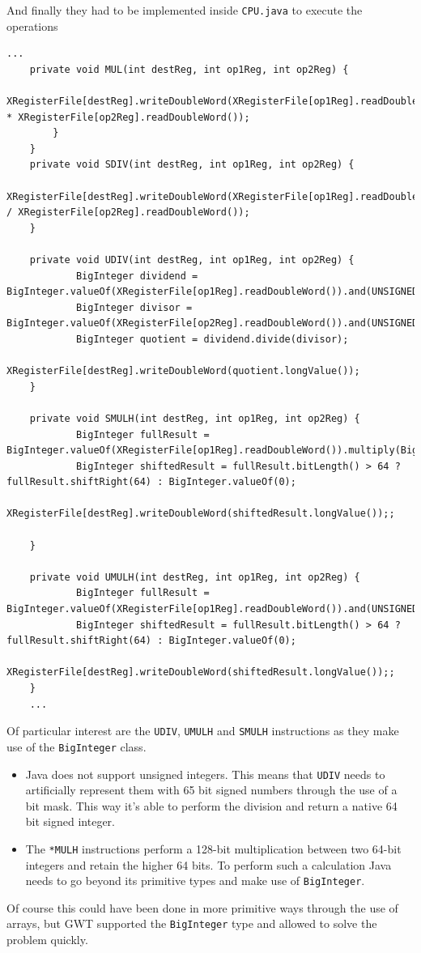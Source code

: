 And finally they had to be implemented inside \verb|CPU.java| to execute the operations
\begin{lstlisting}[caption={}]
	...
	private void MUL(int destReg, int op1Reg, int op2Reg) {											
			XRegisterFile[destReg].writeDoubleWord(XRegisterFile[op1Reg].readDoubleWord() * XRegisterFile[op2Reg].readDoubleWord());
		}
	}
	private void SDIV(int destReg, int op1Reg, int op2Reg) {
			XRegisterFile[destReg].writeDoubleWord(XRegisterFile[op1Reg].readDoubleWord() / XRegisterFile[op2Reg].readDoubleWord());
	}
	
	private void UDIV(int destReg, int op1Reg, int op2Reg) {
			BigInteger dividend = BigInteger.valueOf(XRegisterFile[op1Reg].readDoubleWord()).and(UNSIGNED_LONG_MASK);
			BigInteger divisor = BigInteger.valueOf(XRegisterFile[op2Reg].readDoubleWord()).and(UNSIGNED_LONG_MASK);
			BigInteger quotient = dividend.divide(divisor);
			XRegisterFile[destReg].writeDoubleWord(quotient.longValue());
	}
	
	private void SMULH(int destReg, int op1Reg, int op2Reg) {
			BigInteger fullResult = BigInteger.valueOf(XRegisterFile[op1Reg].readDoubleWord()).multiply(BigInteger.valueOf(XRegisterFile[op2Reg].readDoubleWord()));
			BigInteger shiftedResult = fullResult.bitLength() > 64 ? fullResult.shiftRight(64) : BigInteger.valueOf(0);
			XRegisterFile[destReg].writeDoubleWord(shiftedResult.longValue());;
			
	}
	
	private void UMULH(int destReg, int op1Reg, int op2Reg) {
			BigInteger fullResult = BigInteger.valueOf(XRegisterFile[op1Reg].readDoubleWord()).and(UNSIGNED_LONG_MASK).multiply(BigInteger.valueOf(XRegisterFile[op2Reg].readDoubleWord()).and(UNSIGNED_LONG_MASK));
			BigInteger shiftedResult = fullResult.bitLength() > 64 ? fullResult.shiftRight(64) : BigInteger.valueOf(0);
			XRegisterFile[destReg].writeDoubleWord(shiftedResult.longValue());;
	}
	...
\end{lstlisting}
Of particular interest are the \verb|UDIV|, \verb|UMULH| and \verb|SMULH| instructions as they make use of the \verb|BigInteger| class.
\begin{itemize}[label=\textendash]
\item Java does not support unsigned integers. This means that \verb|UDIV| needs to artificially represent them with 65 bit signed numbers through the use of a bit mask. This way it's able to perform the division and return a native 64 bit signed integer.
\item The \verb|*MULH| instructions perform a 128-bit multiplication between two 64-bit integers and retain the higher 64 bits. To perform such a calculation Java needs to go beyond its primitive types and make use of \verb|BigInteger|.
\end{itemize}
Of course this could have been done in more primitive ways through the use of arrays, but GWT supported the \verb|BigInteger| type and allowed to solve the problem quickly.

